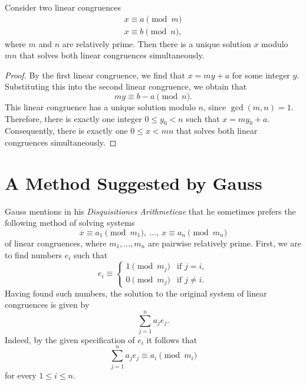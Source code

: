 \begin{theorem}\label{theorem:chinese-remainder-theorem}
  Consider two linear congruences
  \begin{align*}
    x\equiv a \pmod{m} \\
    x\equiv b \pmod{n},
  \end{align*}
  where $m$ and $n$ are relatively prime. Then there is a unique solution $x$ modulo $mn$ that solves both linear congruences simultaneously.
\end{theorem}

\begin{proof}
  By the first linear congruence, we find that $x=my+a$ for some integer $y$. Substituting this into the second linear congruence, we obtain that
  \begin{equation*}
    my\equiv b-a \pmod{n}.
  \end{equation*}
  This linear congruence has a unique solution modulo $n$, since $\gcd(m,n)=1$. Therefore, there is exactly one integer $0\leq y_0 < n$ such that $x=my_0 + a$. Consequently, there is exactly one $0\leq x < mn$ that solves both linear congruences simultaneously.
\end{proof}

\section{A Method Suggested by Gauss}

Gauss mentions in his \emph{Disquisitiones Arithmeticae} \cite[Article 36]{gauss1986} that he sometimes prefers the following method of solving systems
\begin{equation*}
  x\equiv a_1\pmod{m_1},~\ldots,~ x\equiv a_n\pmod{m_n}
\end{equation*}
of linear congruences, where $m_1,\ldots,m_n$ are pairwise relatively prime. First, we are to find numbers $e_i$ such that
\begin{equation}\label{equation:gauss-method-crt}
  e_i\equiv
  \begin{cases}
    1 \pmod{m_j} & \text{if }j=i,\\
    0 \pmod{m_j} & \text{if }j\neq i.
  \end{cases}
\end{equation}
Having found such numbers, the solution to the original system of linear congruences is given by
\begin{equation*}
  \sum_{j=1}^n a_je_j.
\end{equation*}
Indeed, by the given specification of $e_i$ it follows that
\begin{equation*}
  \sum_{j=1}^n a_je_j\equiv a_i\pmod{m_i}
\end{equation*}
for every $1\leq i\leq n$.

